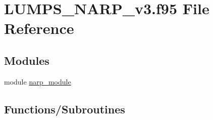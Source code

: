 \hypertarget{_l_u_m_p_s___n_a_r_p__v3_8f95}{}\section{L\+U\+M\+P\+S\+\_\+\+N\+A\+R\+P\+\_\+v3.\+f95 File Reference}
\label{_l_u_m_p_s___n_a_r_p__v3_8f95}
\subsection*{Modules}
\begin{DoxyCompactItemize}
\item 
module \hyperlink{namespacenarp__module}{narp\+\_\+module}
\end{DoxyCompactItemize}
\subsection*{Functions/\+Subroutines}
